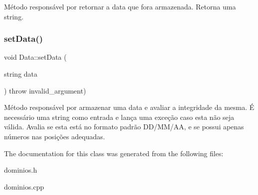 Método responsável por retornar a data que fora armazenada. Retorna uma string. \mbox{\label{classData_a75a50f88bc966f20826a3959717a5acc}} 
\subsubsection{\texorpdfstring{set\+Data()}{setData()}}
{\footnotesize\ttfamily void Data\+::set\+Data (\begin{DoxyParamCaption}\item[{string}]{data }\end{DoxyParamCaption}) throw  invalid\+\_\+argument) }

Método responsável por armazenar uma data e avaliar a integridade da mesma. É necessário uma string como entrada e lança uma exceção caso esta não seja válida. Avalia se esta está no formato padrão D\+D/\+M\+M/\+AA, e se possui apenas números nas posições adequadas. 

The documentation for this class was generated from the following files\+:\begin{DoxyCompactItemize}
\item 
dominios.\+h\item 
dominios.\+cpp\end{DoxyCompactItemize}

